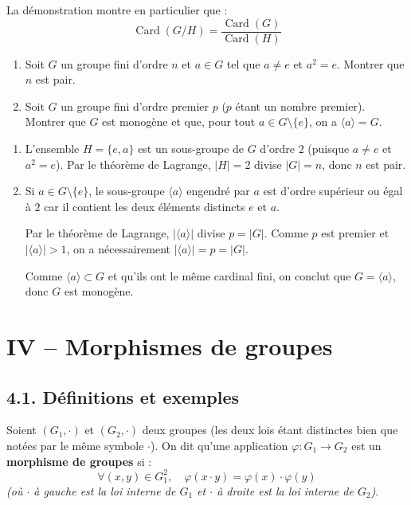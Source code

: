 \documentclass[a4paper,11pt]{article}
\DeclareMathOperator{\Card}{Card}
\newcommand{\mot}[1]{\textcolor{bordeaux}{\textbf{#1}}}
\begin{document}
\begin{remarque}
La démonstration montre en particulier que :
\[
\Card(G/H) = \frac{\Card(G)}{\Card(H)}
\]
\end{remarque}

\begin{exercice}[1]
\begin{enumerate}
  \item Soit $G$ un groupe fini d'ordre $n$ et $a \in G$ tel que $a \neq e$ et $a^2 = e$. Montrer que $n$ est pair.
  \item Soit $G$ un groupe fini d'ordre premier $p$ ($p$ étant un nombre premier). Montrer que $G$ est monogène et que, pour tout $a \in G \setminus \{e\}$, on a $\langle a \rangle = G$.
\end{enumerate}
\end{exercice}

\begin{demonstration}
\begin{enumerate}
  \item L'ensemble $H = \{e, a\}$ est un sous-groupe de $G$ d'ordre $2$ (puisque $a \neq e$ et $a^2 = e$). Par le théorème de Lagrange, $|H| = 2$ divise $|G| = n$, donc $n$ est pair.
  \item Si $a \in G \setminus \{e\}$, le sous-groupe $\langle a \rangle$ engendré par $a$ est d'ordre supérieur ou égal à $2$ car il contient les deux éléments distincts $e$ et $a$.
  
  Par le théorème de Lagrange, $|\langle a \rangle|$ divise $p = |G|$. Comme $p$ est premier et $|\langle a \rangle| > 1$, on a nécessairement $|\langle a \rangle| = p = |G|$.
  
  Comme $\langle a \rangle \subset G$ et qu'ils ont le même cardinal fini, on conclut que $G = \langle a \rangle$, donc $G$ est monogène.
\end{enumerate}
\end{demonstration}

\newpage
\section{IV -- Morphismes de groupes}

\subsection{4.1. Définitions et exemples}

\begin{definition}
Soient $(G_1, \cdot)$ et $(G_2, \cdot)$ deux groupes (les deux lois étant distinctes bien que notées par le même symbole $\cdot$). On dit qu'une application $\varphi : G_1 \to G_2$ est un \mot{morphisme de groupes} si :
\[
\forall (x, y) \in G_1^2, \quad \varphi(x \cdot y) = \varphi(x) \cdot \varphi(y)
\]
\textit{(où $\cdot$ à gauche est la loi interne de $G_1$ et $\cdot$ à droite est la loi interne de $G_2$)}.
\end{definition}
\end{document}
